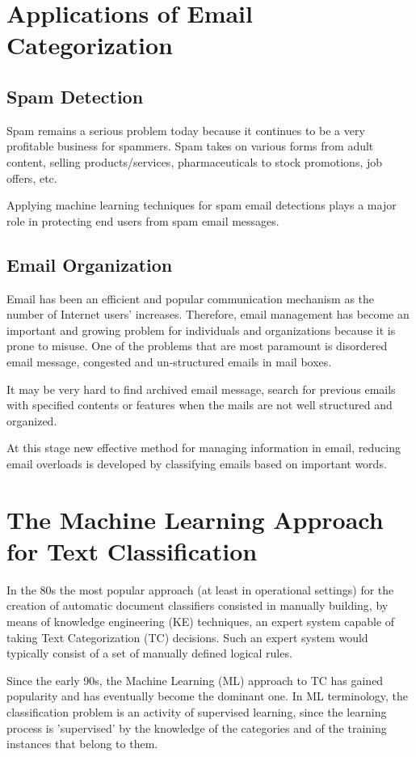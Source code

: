 \section{Applications of Email Categorization}
\subsection{Spam Detection}
Spam remains a serious problem today because it continues to be a very profitable business for spammers. Spam takes on various forms from adult content, selling products/services, pharmaceuticals to stock promotions, job offers, etc.

Applying machine learning techniques for spam email detections plays a major role in protecting end users from spam email messages.\cite{peifeng2007}

\subsection{Email Organization}
Email has been an efficient and popular communication mechanism as the number of
Internet users’ increases. Therefore, email management has become an important and growing problem for individuals and organizations because it is prone to misuse. One of the problems that are most paramount is disordered email message, congested and un-structured emails in mail boxes.

It may be very hard to find archived email message, search for previous emails with specified contents or features when the mails are not well structured and organized.

At this stage new effective method for managing information in email, reducing email overloads is developed by classifying emails based on important words. \cite{taiwo2007}

\section{The Machine Learning Approach for Text Classification}

In the 80s the most popular approach (at least in operational settings) for the
creation of automatic document classiﬁers consisted in manually building, by means
of knowledge engineering (KE) techniques, an expert system capable of taking Text Categorization (TC) decisions. Such an expert system would typically consist of a set of manually deﬁned logical rules.

Since the early 90s, the Machine Learning (ML) approach to TC has gained popularity and has eventually become the dominant one. In ML terminology, the classification problem is an activity of supervised learning, since the learning process is 'supervised' by the knowledge of
the categories and of the training instances that belong to them.

